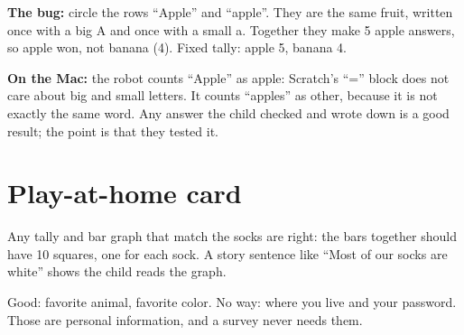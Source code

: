 \begin{answer}
\textbf{The bug:} circle the rows \enquote{Apple} and \enquote{apple}. They are the same fruit, written once with a big A and once with a small a. Together they make 5 apple answers, so apple won, not banana (4). Fixed tally: apple 5, banana 4.

\textbf{On the Mac:} the robot counts \enquote{Apple} as apple: Scratch's \enquote{=} block does not care about big and small letters. It counts \enquote{apples} as other, because it is not exactly the same word. Any answer the child checked and wrote down is a good result; the point is that they tested it.
\end{answer}

\section{Play-at-home card}
\begin{answer}
Any tally and bar graph that match the socks are right: the bars together should have 10 squares, one for each sock. A story sentence like \enquote{Most of our socks are white} shows the child reads the graph.
\end{answer}

\begin{answer}
Good: favorite animal, favorite color. No way: where you live and your password. Those are personal information, and a survey never needs them.
\end{answer}

